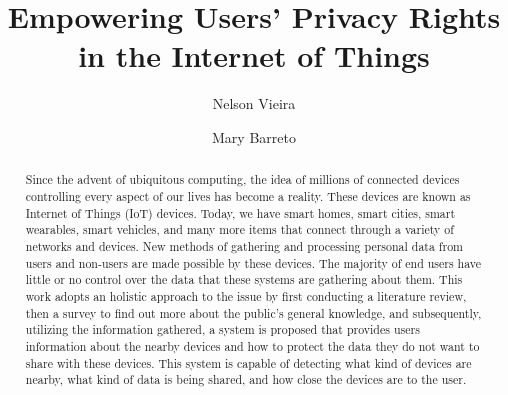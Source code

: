 \documentclass[manuscript,natbib=false]{acmart}
\begin{document}
\title{Empowering Users' Privacy Rights in the Internet of Things}

\author{Nelson Vieira}

\author{Mary Barreto}

\renewcommand{\shortauthors}{Vieira and Barreto}

\begin{abstract}
    Since the advent of ubiquitous computing, the idea of millions of connected
    devices controlling every aspect of our lives has become a reality. These
    devices are known as Internet of Things (IoT) devices. Today, we have smart
    homes, smart cities, smart wearables, smart vehicles, and many more items
    that connect through a variety of networks and devices. New methods of
    gathering and processing personal data from users and non-users are
    made possible by these devices. The majority of end users have little
    or no control over the data that these systems are gathering about them.
    This work adopts an holistic approach to the issue by first conducting a
    literature review, then a survey to find out more about the public's
    general knowledge, and subsequently, utilizing the information gathered,
    a system is proposed that provides users information about the nearby
    devices and how to protect the data they do not want to share with these
    devices. This system is capable of detecting what kind of devices are
    nearby, what kind of data is being shared, and how close the devices
    are to the user.
    \end{abstract}
\end{document}
